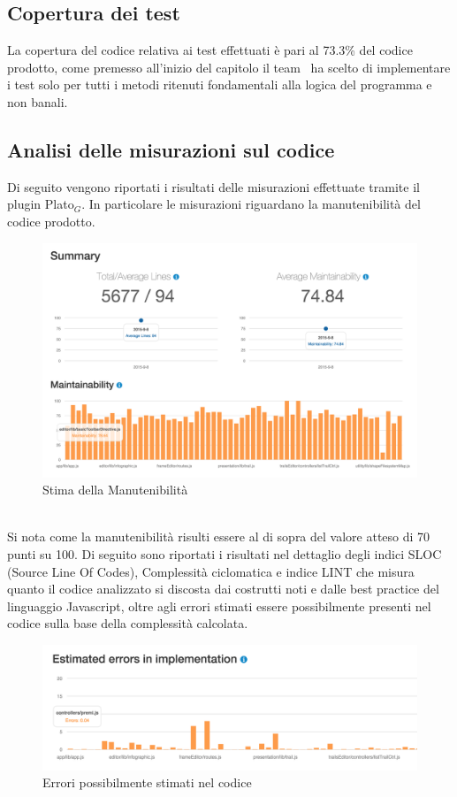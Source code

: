 \subsection {Copertura dei test}

La copertura del codice relativa ai test effettuati è pari al 73.3\% del codice prodotto,
come premesso all'inizio del capitolo il team \gruppo\ ha scelto di implementare i test solo per tutti i metodi ritenuti fondamentali alla logica del programma e non banali.
\pagebreak
\subsection{Analisi delle misurazioni sul codice}

Di seguito vengono riportati i risultati delle misurazioni effettuate tramite il plugin Plato$_G$. In particolare le misurazioni riguardano la manutenibilità del codice prodotto.

\begin{figure}[h!]
   	\centering
   	\includegraphics[scale=.4]{img/manutenibilita.png}
   	\caption{Stima della Manutenibilità}
\end{figure} \\
Si nota come la manutenibilità risulti essere al di sopra del valore atteso di 70 punti su 100.
Di seguito sono riportati i risultati nel dettaglio degli indici SLOC (Source Line Of Codes), Complessità ciclomatica e indice LINT che misura quanto il codice analizzato si discosta dai costrutti noti e dalle best practice del linguaggio Javascript, oltre agli errori stimati essere possibilmente presenti nel codice sulla base della complessità calcolata.

\begin{figure}[h!]
	\centering
	\includegraphics[scale=.4]{img/errors.png}
	\caption{Errori possibilmente stimati nel codice}
\end{figure} 

